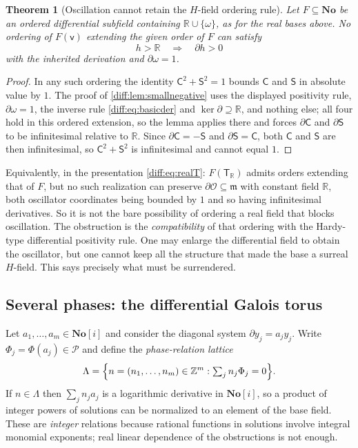 \documentclass[11pt,letterpaper]{article}
\numberwithin{equation}{section}
\newtheorem{theorem}{Theorem}[section]
\theoremstyle{definition}
\theoremstyle{remark}
\newcommand{\No}{\mathbf{No}}
\newcommand{\SC}{\mathbf{No}[i]}
\newcommand{\R}{\mathbb R}
\newcommand{\Z}{\mathbb Z}
\newcommand{\der}{\partial}
\newcommand{\Ofin}{\mathcal O}
\newcommand{\mm}{\mathfrak m}
\newcommand{\Pcl}{\mathcal P}
\begin{document}
\begin{theorem}[Oscillation cannot retain the $H$-field ordering rule]
\label{diff:thm:orderobstruction}
Let $F\subseteq\No$ be an ordered differential subfield containing
$\R\cup\{\omega\}$, as for the real bases above. No ordering of
$F(\mathsf v)$ extending the given order of $F$ can satisfy
\[
 h>\R\quad\Longrightarrow\quad \der h>0
\]
with the inherited derivation and $\der\omega=1$.
\end{theorem}
\begin{proof}
In any such ordering the identity $\mathsf C^{2}+\mathsf S^{2}=1$ bounds
$\mathsf C$ and $\mathsf S$ in absolute value by $1$. The proof of
\cref{diff:lem:smallnegative} uses the displayed positivity rule,
$\der\omega=1$, the inverse rule \eqref{diff:eq:basicder} and
$\ker\der\supseteq\R$, and nothing else; all four hold in this ordered
extension, so the lemma applies there and forces
$\der\mathsf C$ and $\der\mathsf S$ to be infinitesimal relative to $\R$.
Since $\der\mathsf C=-\mathsf S$ and $\der\mathsf S=\mathsf C$, both
$\mathsf C$ and $\mathsf S$ are then infinitesimal, so
$\mathsf C^{2}+\mathsf S^{2}$ is infinitesimal and cannot equal $1$.
\end{proof}

Equivalently, in the presentation \cref{diff:eq:realT}: $F(\mathsf T_{\R})$ admits
orders extending that of $F$, but no such realization can preserve
$\der\Ofin\subseteq\mm$ with constant field $\R$, both oscillator coordinates
being bounded by $1$ and so having infinitesimal derivatives. So it is not the
bare possibility of ordering a real field that blocks oscillation. The
obstruction is the \emph{compatibility} of that ordering with the Hardy-type
differential positivity rule. One may enlarge the differential field to obtain
the oscillator, but one cannot keep all the structure that made the base a
surreal $H$-field. This says precisely what must be surrendered.

\subsection{Several phases: the differential Galois torus}
\label{diff:sub:torus}

Let $a_{1},\dots,a_{m}\in\SC$ and consider the diagonal system
$\der y_{j}=a_{j}y_{j}$. Write $\Phi_{j}=\Phi(a_{j})\in\Pcl$ and define the
\emph{phase-relation lattice}
\begin{equation}\label{diff:eq:lattice}
 \Lambda=\Bigl\{n=(n_{1},\dots,n_{m})\in\Z^{m}:
 \textstyle\sum_{j}n_{j}\Phi_{j}=0\Bigr\}.
\end{equation}
If $n\in\Lambda$ then $\sum_{j}n_{j}a_{j}$ is a logarithmic derivative in
$\SC$, so a product of integer powers of solutions can be normalized to an
element of the base field. These are \emph{integer} relations because rational
functions in solutions involve integral monomial exponents; real linear
dependence of the obstructions is not enough.
\end{document}
